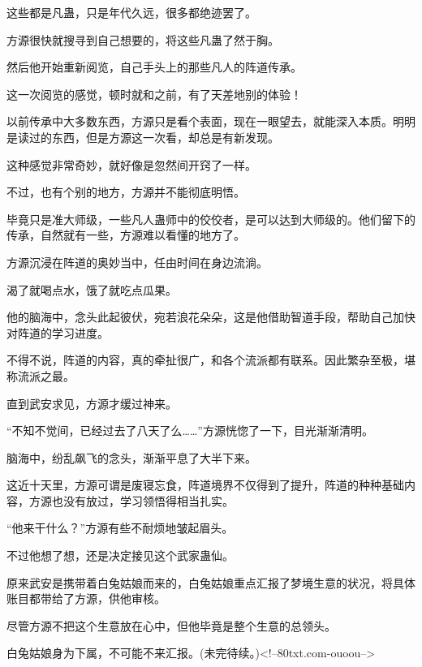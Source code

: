 \begin{this_body}
这些都是凡蛊，只是年代久远，很多都绝迹罢了。

方源很快就搜寻到自己想要的，将这些凡蛊了然于胸。

然后他开始重新阅览，自己手头上的那些凡人的阵道传承。

这一次阅览的感觉，顿时就和之前，有了天差地别的体验！

以前传承中大多数东西，方源只是看个表面，现在一眼望去，就能深入本质。明明是读过的东西，但是方源这一次看，却总是有新发现。

这种感觉非常奇妙，就好像是忽然间开窍了一样。

不过，也有个别的地方，方源并不能彻底明悟。

毕竟只是准大师级，一些凡人蛊师中的佼佼者，是可以达到大师级的。他们留下的传承，自然就有一些，方源难以看懂的地方了。

方源沉浸在阵道的奥妙当中，任由时间在身边流淌。

渴了就喝点水，饿了就吃点瓜果。

他的脑海中，念头此起彼伏，宛若浪花朵朵，这是他借助智道手段，帮助自己加快对阵道的学习进度。

不得不说，阵道的内容，真的牵扯很广，和各个流派都有联系。因此繁杂至极，堪称流派之最。

直到武安求见，方源才缓过神来。

“不知不觉间，已经过去了八天了么……”方源恍惚了一下，目光渐渐清明。

脑海中，纷乱飙飞的念头，渐渐平息了大半下来。

这近十天里，方源可谓是废寝忘食，阵道境界不仅得到了提升，阵道的种种基础内容，方源也没有放过，学习领悟得相当扎实。

“他来干什么？”方源有些不耐烦地皱起眉头。

不过他想了想，还是决定接见这个武家蛊仙。

原来武安是携带着白兔姑娘而来的，白兔姑娘重点汇报了梦境生意的状况，将具体账目都带给了方源，供他审核。

尽管方源不把这个生意放在心中，但他毕竟是整个生意的总领头。

白兔姑娘身为下属，不可能不来汇报。(未完待续。)<!--80txt.com-ouoou-->

\end{this_body}

